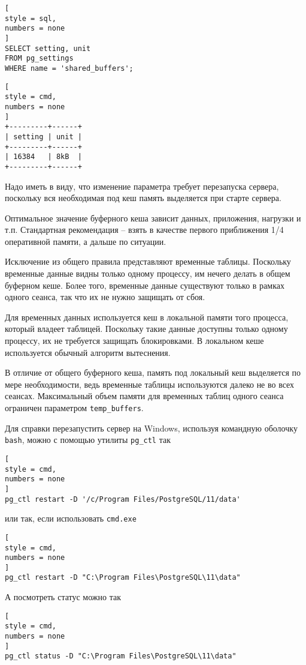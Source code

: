 \documentclass[%
	11pt,
	a4paper,
	utf8,
		]{article}
\begin{document}
\begin{lstlisting}[
style = sql,
numbers = none
]
SELECT setting, unit
FROM pg_settings
WHERE name = 'shared_buffers';
\end{lstlisting}

\begin{lstlisting}[
style = cmd,
numbers = none
]
+---------+------+
| setting | unit |
+---------+------+
| 16384   | 8kB  |
+---------+------+
\end{lstlisting}

Надо иметь в виду, что изменение параметра требует перезапуска сервера, поскольку вся необходимая под кеш память выделяется при старте сервера.

Оптимальное значение буферного кеша зависит данных, приложения, нагрузки и т.п. Стандартная рекомендация -- взять в качестве первого приближения 1/4 оперативной памяти, а дальше по ситуации.

Исключение из общего правила представляют временные таблицы. Поскольку временные данные видны только одному процессу, им нечего делать в общем буферном кеше. Более того, временные данные существуют только в рамках одного сеанса, так что их не нужно защищать от сбоя.

Для временных данных используется кеш в локальной памяти того процесса, который владеет таблицей. Поскольку такие данные доступны только одному процессу, их не требуется защищать блокировками. В локальном кеше используется обычный алгоритм вытеснения. 

В отличие от общего буферного кеша, память под локальный кеш выделяется по мере необходимости, ведь временные таблицы используются далеко не во всех сеансах. Максимальный объем памяти для временных таблиц одного сеанса ограничен параметром \verb|temp_buffers|.

Для справки перезапустить сервер на Windows, используя командную оболочку \texttt{bash}, можно с помощью утилиты \verb|pg_ctl| так
\begin{lstlisting}[
style = cmd,
numbers = none
]
pg_ctl restart -D '/c/Program Files/PostgreSQL/11/data'
\end{lstlisting}
или так, если использовать \texttt{cmd.exe}
\begin{lstlisting}[
style = cmd,
numbers = none
]
pg_ctl restart -D "C:\Program Files\PostgreSQL\11\data"
\end{lstlisting}

А посмотреть статус можно так
\begin{lstlisting}[
style = cmd,
numbers = none
]
pg_ctl status -D "C:\Program Files\PostgreSQL\11\data"
\end{lstlisting}
\end{document}
